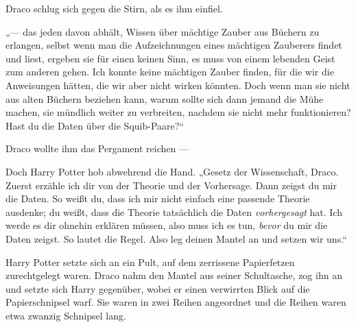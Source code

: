 Draco schlug sich gegen die Stirn, als es ihm einfiel.

„— das jeden davon abhält, Wissen über mächtige Zauber aus Büchern zu erlangen, selbst wenn man die Aufzeichnungen eines mächtigen Zauberers findet und liest, ergeben sie für einen keinen Sinn, es muss von einem lebenden Geist zum anderen gehen. Ich konnte keine mächtigen Zauber finden, für die wir die Anweisungen hätten, die wir aber nicht wirken könnten. Doch wenn man sie nicht aus alten Büchern beziehen kann, warum sollte sich dann jemand die Mühe machen, sie mündlich weiter zu verbreiten, nachdem sie nicht mehr funktionieren? Hast du die Daten über die Squib-Paare?“

Draco wollte ihm das Pergament reichen —

Doch Harry Potter hob abwehrend die Hand.
„Gesetz der Wissenschaft, Draco. Zuerst erzähle ich dir von der Theorie und der Vorhersage. Dann zeigst du mir die Daten. So weißt du, dass ich mir nicht einfach eine passende Theorie ausdenke; du weißt, dass die Theorie tatsächlich die Daten \emph{vorhergesagt} hat. Ich werde es dir ohnehin erklären müssen, also muss ich es tun, \emph{bevor} du mir die Daten zeigst. So lautet die Regel. Also leg deinen Mantel an und setzen wir uns.“

Harry Potter setzte sich an ein Pult, auf dem zerrissene Papierfetzen zurechtgelegt waren. Draco nahm den Mantel aus seiner Schultasche, zog ihn an und setzte sich Harry gegenüber, wobei er einen verwirrten Blick auf die Papierschnipsel warf. Sie waren in zwei Reihen angeordnet und die Reihen waren etwa zwanzig Schnipsel lang.

